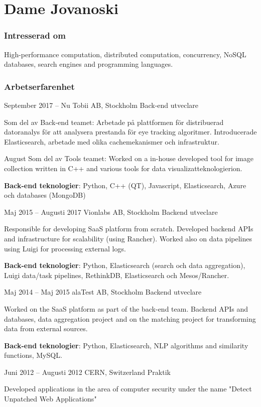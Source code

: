 \documentclass{tccv}
\begin{document}
\part{Dame Jovanoski}

\section{Intresserad om}
High-performance computation, distributed computation,
concurrency, NoSQL databases, search engines and programming languages.

\section{Arbetserfarenhet}

\begin{eventlist}

\item{September 2017 -- Nu}
     {Tobii AB, Stockholm}
     {Back-end utveclare}

Som del av Back-end teamet:
Arbetade på plattformen för distribuerad datoranalys för att analysera prestanda för eye tracking algoritmer. Introducerade Elasticsearch, arbetade med olika cachemekanismer och infrastruktur.

\break
August
Som del av Tools teamet:
Worked on a in-house developed tool for image collection written in C++ and various tools for data visualizatteknologierion.
\break

\textbf{Back-end teknologier}: Python, C++ (QT), Javascript, Elasticsearch, Azure och databases (MongoDB)\break

\item{Maj 2015 -- Augusti 2017}
     {Vionlabs AB, Stockholm}
     {Backend utveclare}

Responsible for developing SaaS platform from scratch. Developed backend APIs and infrastructure for scalability (using Rancher).
Worked also on data pipelines using Luigi for processing external logs. \break

\textbf{Back-end teknologier}:  Python, Elasticsearch (search och data aggregation),  Luigi data/task pipelines, RethinkDB, Elasticsearch och Mesos/Rancher.\break

\item{Maj 2014 -- Maj 2015}
     {alaTest  AB, Stockholm}
     {Backend utveclare}

Worked on the SaaS platform as part of the back-end team. Backend APIs and databases, data aggregation project and on the matching project for
transforming data from external sources.\break

\textbf{Back-end teknologier}: Python, Elasticsearch, NLP algorithms and similarity functions, MySQL.\break

\item{Juni 2012 -- Augusti 2012}
     {CERN, Switzerland}
     {Praktik}

Developed applications in the area of computer security under the name "Detect Unpatched Web Applications"

\end{eventlist}
\end{document}
